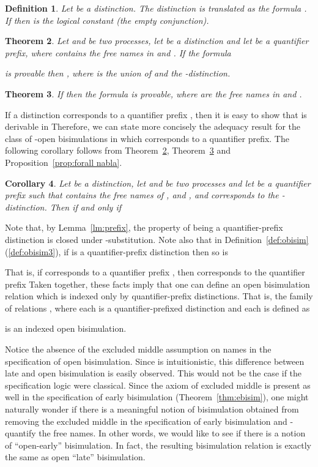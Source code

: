 \documentclass{acmtrans2m}
\newenvironment{definition}{\begin{define} \rm}{\end{define}}
\newtheorem{theorem}{Theorem}
\newtheorem{corollary}[theorem]{Corollary}
\newtheorem{define}[theorem]{Definition}
\begin{document}
\begin{definition}
Let  be a distinction.  The
distinction  is translated as the formula .  If  then  is the logical constant  (the empty conjunction).
\end{definition}


\begin{theorem}
\label{thm:open bisim sound}
Let  and  be two processes, let  be a distinction and
let  be a quantifier prefix, where  contains
the free names in  and .
If the formula 

is provable then , where  is the union of
 and the -distinction.
\end{theorem}

\begin{theorem}
\label{thm:open bisim complete}
If  then the formula
 is provable, where 
are the free names in  and .
\end{theorem}

If a distinction  corresponds to a quantifier prefix , 
then it is easy to show that  is derivable in 
Therefore, we can state more concisely the adequacy result for the class of 
-open bisimulations in which  corresponds to a quantifier
prefix.  The following
corollary follows from Theorem~\ref{thm:open bisim sound}, 
Theorem~\ref{thm:open bisim complete} and Proposition~\ref{prop:forall nabla}. 

\begin{corollary}
\label{cor:open bisim prefix}
Let  be a distinction, let  and  be two processes and let 
be a quantifier prefix such that  contains the free names of ,  and ,
and  corresponds to the -distinction. Then
 if and only if 
\end{corollary}

Note that, by Lemma~\ref{lm:prefix}, the property of being a quantifier-prefix distinction
is closed under -substitution. Note also that in Definition~\ref{def:obisim}(\ref{def:obisim3}),
if  is a quantifier-prefix distinction then so is 

That is, if  corresponds to a quantifier prefix ,
then  corresponds to the quantifier prefix 
Taken together, these facts imply that one can define 
an open bisimulation relation which is indexed only by 
quantifier-prefix distinctions. That is, the family of relations ,
where each  is a quantifier-prefixed distinction and each  is defined as

is an indexed open bisimulation. 


Notice the absence of the excluded middle assumption on names in the
specification of open bisimulation. Since  is
intuitionistic, this difference between late and open bisimulation is
easily observed.  This would not be the case if the specification logic were
classical.  Since the axiom of excluded middle is present as well in
the specification of early bisimulation (Theorem~\ref{thm:ebisim}),
one might naturally wonder if there is a meaningful notion of
bisimulation obtained from removing the excluded middle in the
specification of early bisimulation and -quantify the free names.
In other words, we would like to see if there is a
notion of ``open-early'' bisimulation. In fact, 
the resulting bisimulation relation is exactly the same as open ``late''
bisimulation.
\end{document}
